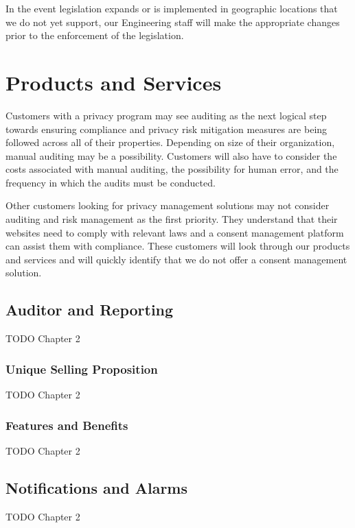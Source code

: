 In the event legislation expands or is implemented in geographic locations that we do not yet support, our Engineering staff will make the appropriate changes prior to the enforcement of the legislation.


\section{Products and Services}

Customers with a privacy program may see auditing as the next logical step towards ensuring compliance and privacy risk mitigation measures are being followed across all of their properties. Depending on size of their organization, manual auditing may be a possibility. Customers will also have to consider the costs associated with manual auditing, the possibility for human error, and the frequency in which the audits must be conducted. 

Other customers looking for privacy management solutions may not consider auditing and risk management as the first priority. They understand that their websites need to comply with relevant laws and a consent management platform can assist them with compliance. These customers will look through our products and services and will quickly identify that we do not offer a consent management solution. 




\subsection{Auditor and Reporting}
TODO Chapter 2

\subsubsection*{Unique Selling Proposition}
TODO Chapter 2

\subsubsection*{Features and Benefits}
TODO Chapter 2


\subsection{Notifications and Alarms}
TODO Chapter 2

